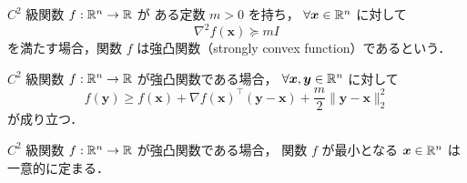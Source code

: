 \begin{definition}
    $C^2$ 級関数 $f : \mathbb{R}^n \to \mathbb{R}$ が
    ある定数 $m > 0$ を持ち，
    $\forall \bm{x} \in \mathbb{R}^n$ に対して
    \begin{equation}
        \nabla^2 f(\bm{x}) \succeq m I
    \end{equation}
    を満たす場合，関数 $f$ は強凸関数（strongly convex function）であるという．
\end{definition}

\begin{theorem}
    $C^2$ 級関数 $f : \mathbb{R}^n \to \mathbb{R}$ が強凸関数である場合，
    $\forall \bm{x}, \bm{y} \in \mathbb{R}^n$ に対して
    \begin{equation}
        f(\bm{y}) \ge f(\bm{x}) + \nabla f(\bm{x})^\top (\bm{y} - \bm{x})
        + \frac{m}{2} \| \bm{y} - \bm{x} \|_2^2
    \end{equation}
    が成り立つ．
\end{theorem}

\begin{theorem}
    $C^2$ 級関数 $f : \mathbb{R}^n \to \mathbb{R}$ が強凸関数である場合，
    関数 $f$ が最小となる $\bm{x} \in \mathbb{R}^n$ は一意的に定まる．
\end{theorem}





